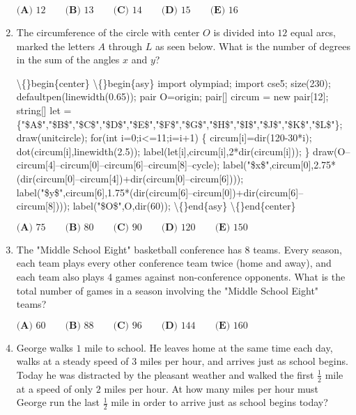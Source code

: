 \documentclass{article}
\begin{document}
\begin{enumerate}[label=\arabic*., itemsep=0.5em]
\( \textbf{(A) }12\qquad\textbf{(B) }13\qquad\textbf{(C) }14\qquad\textbf{(D) }15\qquad\textbf{(E) }16 \)\par \vspace{0.5em}\item The circumference of the circle with center \(O\) is divided into \(12\) equal arcs, marked the letters \(A\) through \(L\) as seen below. What is the number of degrees in the sum of the angles \(x\) and \(y\)?


\textbackslash\{\}begin\{center\}
\textbackslash\{\}begin\{asy\}
import olympiad;
import cse5;
size(230);
defaultpen(linewidth(0.65));
pair O=origin;
pair[] circum = new pair[12];
string[] let = \{"\$A\$","\$B\$","\$C\$","\$D\$","\$E\$","\$F\$","\$G\$","\$H\$","\$I\$","\$J\$","\$K\$","\$L\$"\};
draw(unitcircle);
for(int i=0;i<=11;i=i+1)
\{
circum[i]=dir(120-30*i);
dot(circum[i],linewidth(2.5));
label(let[i],circum[i],2*dir(circum[i]));
\}
draw(O--circum[4]--circum[0]--circum[6]--circum[8]--cycle);
label("\$x\$",circum[0],2.75*(dir(circum[0]--circum[4])+dir(circum[0]--circum[6])));
label("\$y\$",circum[6],1.75*(dir(circum[6]--circum[0])+dir(circum[6]--circum[8])));
label("\$O\$",O,dir(60));
\textbackslash\{\}end\{asy\}
\textbackslash\{\}end\{center\}


\( \textbf{(A) }75\qquad\textbf{(B) }80\qquad\textbf{(C) }90\qquad\textbf{(D) }120\qquad\textbf{(E) }150 \)\par \vspace{0.5em}\item The "Middle School Eight" basketball conference has 8 teams. Every season, each team plays every other conference team twice (home and away), and each team also plays 4 games against non-conference opponents. What is the total number of games in a season involving the "Middle School Eight" teams?

\( \textbf{(A) }60\qquad\textbf{(B) }88\qquad\textbf{(C) }96\qquad\textbf{(D) }144\qquad\textbf{(E) }160 \)\par \vspace{0.5em}\item George walks \(1\) mile to school. He leaves home at the same time each day, walks at a steady speed of \(3\) miles per hour, and arrives just as school begins. Today he was distracted by the pleasant weather and walked the first \(\frac{1}{2}\) mile at a speed of only \(2\) miles per hour. At how many miles per hour must George run the last \(\frac{1}{2}\) mile in order to arrive just as school begins today?


\end{enumerate}
\end{document}
